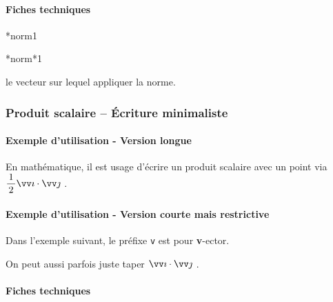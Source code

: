 \documentclass[12pt,a4paper]{article}
\makeatletter
\theoremstyle{definition}
\newcommand\IDmacro{\@ifstar{\@IDmacro@star}{\@IDmacro@no@star}}
\newcommand\@IDmacro@no@star[3]{%
    \texttt{%
    	\textbackslash#1%
    	\IfStrEq{#2}{0}{}{%
    		\,\,[#2 Option%
				\IfStrEq{#2}{1}{}{s}]%
			}%
	    \IfStrEq{#3}{}{}{%
	    		\,\,(#3 Argument%
				\IfStrEq{#3}{1}{}{s})%
			}
	   	}
    \immediate\write\tempfile{macro,#1,#2,#3}%
}
\newcommand\@IDmacro@star[2]{%
    \@IDmacro@no@star{#1}{0}{#2}%
}
\newcommand\@IDoptarg{\@ifstar{\@IDoptarg@star}{\@IDoptarg@no@star}}
\newcommand\@IDoptarg@star[2]{%
	\vspace{0.5em}
	\textbf{---} \texttt{#1%
		\IfStrEq{#2}{}{:}{\,#2:}%
	}%
}
\newcommand\@IDoptarg@no@star[2]{%
	\IfStrEq{#2}{}{%
		\@IDoptarg@star{#1}{}%
	}{%
		\@IDoptarg@star{#1}{#2}%
	}%
}
\newcommand\IDarg[1]{%
	\@IDoptarg{Argument}{#1}%
}
\makeatother
\begin{document}
            \paragraph{Fiches techniques}

\IDmacro*{norm}{1}

\IDmacro*{norm*}{1}

\IDarg{} le vecteur sur lequel appliquer la norme.






		\subsubsection{Produit scalaire -- Écriture minimaliste}

            \paragraph{Exemple d'utilisation - Version longue}

\begin{tcblisting}{}
En mathématique, il est usage d'écrire un produit scalaire avec un point via
$\dotprod{\dfrac{1}{2} \vect{i}}{\vect{j}}$ .
\end{tcblisting}


            \paragraph{Exemple d'utilisation - Version courte mais restrictive}

Dans l'exemple suivant, le préfixe \verb+v+ est pour \textbf{v}-ector.

\begin{tcblisting}{}
On peut aussi parfois juste taper $\vdotprod{i}{j}$ .
\end{tcblisting}


            \paragraph{Fiches techniques}
\end{document}
